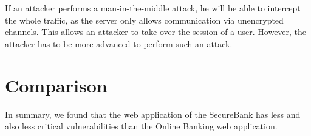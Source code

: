 If an attacker performs a man-in-the-middle attack, he will be able to intercept the whole traffic, as the server only allows communication via unencrypted channels. This allows an attacker to take over the session of a user. However, the attacker has to be more advanced to perform such an attack.

\section{Comparison}
In summary, we found that the web application of the SecureBank has less and also less critical vulnerabilities than the Online Banking web application.
